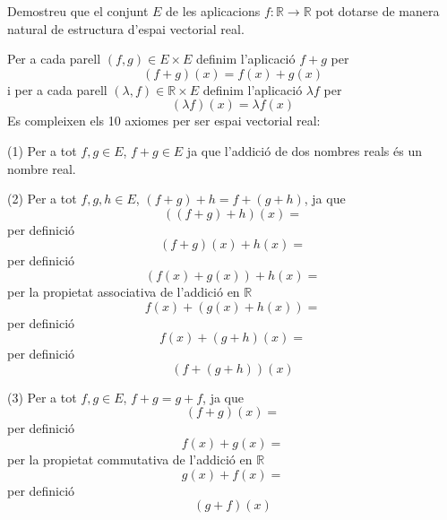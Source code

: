 \begin{exercici}
Demostreu que el conjunt $E$ de les aplicacions $f:\mathbb{R}\rightarrow
\mathbb{R}$ pot dotarse de manera natural de estructura d’espai
vectorial real.

\end{exercici}
\begin{solucio}
Per a cada parell $(f,g)\in E\times E$ definim l’aplicació $f+g$ per%
\begin{equation*}
(f+g)(x)=f(x)+g(x)
\end{equation*}%
i per a cada parell $(\lambda ,f)\in \mathbb{R}\times E$ definim l'aplicació $\lambda f$ per%
\begin{equation*}
(\lambda f)(x)=\lambda f(x)
\end{equation*}%
Es compleixen els 10 axiomes per ser espai vectorial real:

(1) Per a tot $f,g\in E$, $f+g\in E$ ja que l’addició de dos nombres reals és un nombre real.

(2) Per a tot $f,g,h\in E$, $(f+g)+h=f+(g+h)$, ja que
\begin{equation*}
((f+g)+h)(x)=
\end{equation*}%
per definició%
\begin{equation*}
(f+g)(x)+h(x)=
\end{equation*}%
per definició%
\begin{equation*}
(f(x)+g(x))+h(x)=
\end{equation*}%
per la propietat associativa de l’addició en $\mathbb{R}$%
\begin{equation*}
f(x)+(g(x)+h(x))=
\end{equation*}%
per definició%
\begin{equation*}
f(x)+(g+h)(x)=
\end{equation*}%
per definició%
\begin{equation*}
(f+(g+h))(x)
\end{equation*}

(3) Per a tot $f,g\in E$, $f+g=g+f$, ja que%
\begin{equation*}
(f+g)(x)=
\end{equation*}%
per definició
\begin{equation*}
f(x)+g(x)=
\end{equation*}%
per la propietat commutativa de l’addició en $\mathbb{R}$
\begin{equation*}
g(x)+f(x)=
\end{equation*}%
per definició
\begin{equation*}
(g+f)(x)
\end{equation*}


\end{solucio}
